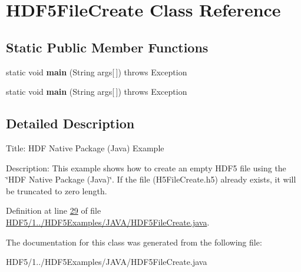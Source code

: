 \hypertarget{class_h_d_f5_file_create}{}\section{H\+D\+F5\+File\+Create Class Reference}
\label{class_h_d_f5_file_create}
\subsection*{Static Public Member Functions}
\begin{DoxyCompactItemize}
\item 
\mbox{\label{class_h_d_f5_file_create_a0e5c6479cc3ce2a16df8317e152d39da}} 
static void {\bfseries main} (String args\mbox{[}$\,$\mbox{]})  throws Exception 
\item 
\mbox{\label{class_h_d_f5_file_create_a0e5c6479cc3ce2a16df8317e152d39da}} 
static void {\bfseries main} (String args\mbox{[}$\,$\mbox{]})  throws Exception 
\end{DoxyCompactItemize}


\subsection{Detailed Description}
Title\+: H\+DF Native Package (Java) Example 

Description\+: This example shows how to create an empty H\+D\+F5 file using the \char`\"{}\+H\+D\+F Native Package (\+Java)\char`\"{}. If the file (H5\+File\+Create.\+h5) already exists, it will be truncated to zero length. 

Definition at line \hyperlink{_h_d_f5_21_810_81_2_h_d_f5_examples_2_j_a_v_a_2_h_d_f5_file_create_8java_source_l00029}{29} of file \hyperlink{_h_d_f5_21_810_81_2_h_d_f5_examples_2_j_a_v_a_2_h_d_f5_file_create_8java_source}{H\+D\+F5/1../\+H\+D\+F5\+Examples/\+J\+A\+V\+A/\+H\+D\+F5\+File\+Create.\+java}.



The documentation for this class was generated from the following file\+:\begin{DoxyCompactItemize}
\item 
H\+D\+F5/1../\+H\+D\+F5\+Examples/\+J\+A\+V\+A/\+H\+D\+F5\+File\+Create.\+java\end{DoxyCompactItemize}
